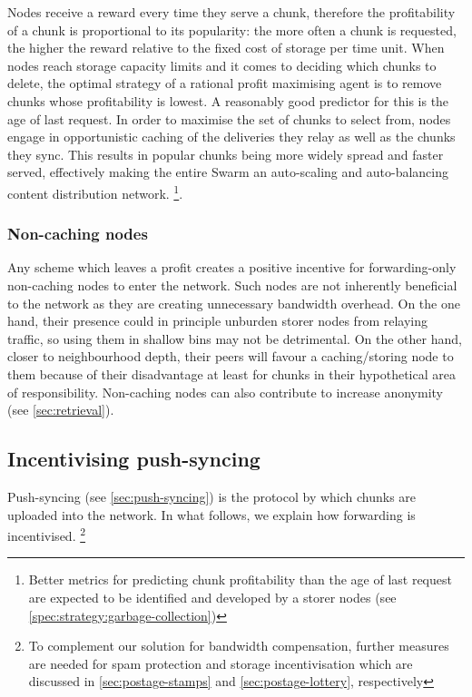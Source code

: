 Nodes receive a reward every time they serve a chunk, therefore the profitability of a chunk is proportional to its popularity: the more often a chunk is requested, the higher the reward relative to the fixed cost of storage per time unit. When nodes reach storage capacity limits and it comes to deciding which chunks to delete, the optimal strategy of a rational profit maximising agent is to remove chunks whose profitability is lowest. A reasonably good predictor for this is the age of last request. In order to maximise the set of chunks to select from, nodes engage in opportunistic caching of the deliveries they relay as well as the chunks they sync. This results in popular chunks being more widely spread and faster served, effectively making the entire Swarm an auto-scaling and auto-balancing content distribution network.%
%
\footnote{Better metrics for predicting chunk profitability than the age of last request are expected to be identified and developed by a storer nodes (see \ref{spec:strategy:garbage-collection})}.


\subsubsection{Non-caching nodes}

Any scheme which leaves  a profit creates a positive incentive for forwarding-only non-caching nodes to enter the network. Such nodes are not inherently beneficial to the network as they are creating unnecessary bandwidth overhead. On the one hand, their presence could in principle unburden storer nodes from relaying traffic, so using them in shallow bins may not be detrimental. On the other hand, closer to neighbourhood depth, their peers will favour a caching/storing node to them because of their disadvantage at least for chunks in their hypothetical area of responsibility. Non-caching nodes can also contribute to increase anonymity (see \ref{sec:retrieval}).

\subsection{Incentivising push-syncing}\label{sec:push-sync-incentives}

\green{}

Push-syncing (see \ref{sec:push-syncing}) is the protocol by which chunks are uploaded into the network. In what follows, we explain how forwarding is incentivised.%
%
\footnote{To complement our solution for bandwidth compensation, further measures are needed for spam protection and storage incentivisation which are discussed in \ref{sec:postage-stamps} and \ref{sec:postage-lottery}, respectively}

